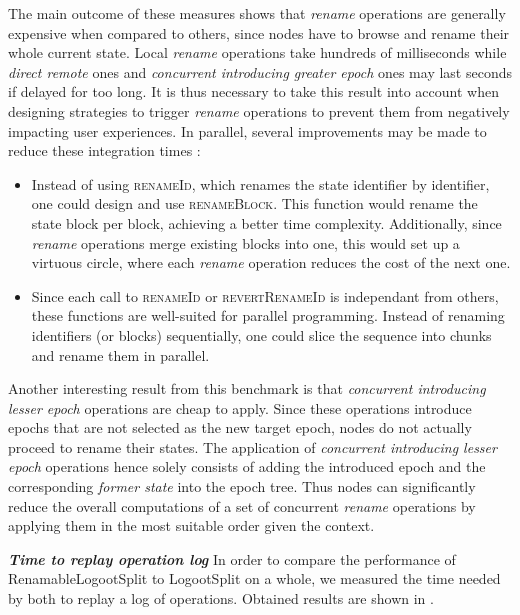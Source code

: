 \documentclass[10pt,journal,compsoc]{IEEEtran}
\newcommand{\headerparagraph}[1]{\textbf{\emph{#1}}\quad}
\begin{document}
The main outcome of these measures shows that \emph{rename} operations are generally expensive when compared to others, since nodes have to browse and rename their whole current state.
Local \emph{rename} operations take hundreds of milliseconds while \emph{direct remote} ones and \emph{concurrent introducing greater epoch} ones may last seconds if delayed for too long.
It is thus necessary to take this result into account when designing strategies to trigger \emph{rename} operations to prevent them from negatively impacting user experiences.
In parallel, several improvements may be made to reduce these integration times :
\begin{itemize}
    \item Instead of using \textsc{renameId}, which renames the state identifier by identifier, one could design and use \textsc{renameBlock}.
        This function would rename the state block per block, achieving a better time complexity.
        Additionally, since \emph{rename} operations merge existing blocks into one, this would set up a virtuous circle, where each \emph{rename} operation reduces the cost of the next one.
    \item Since each call to \textsc{renameId} or \textsc{revertRenameId} is independant from others, these functions are well-suited for parallel programming.
        Instead of renaming identifiers (or blocks) sequentially, one could slice the sequence into chunks and rename them in parallel.
\end{itemize}

Another interesting result from this benchmark is that \emph{concurrent introducing lesser epoch} operations are cheap to apply.
Since these operations introduce epochs that are not selected as the new target epoch, nodes do not actually proceed to rename their states.
The application of \emph{concurrent introducing lesser epoch} operations hence solely consists of adding the introduced epoch and the corresponding \emph{former state} into the epoch tree.
Thus nodes can significantly reduce the overall computations of a set of concurrent \emph{rename} operations by applying them in the most suitable order given the context.

\headerparagraph{Time to replay operation log}
%
In order to compare the performance of RenamableLogootSplit to LogootSplit on a whole, we measured the time needed by both to replay a log of operations.
Obtained results are shown in .
\end{document}
